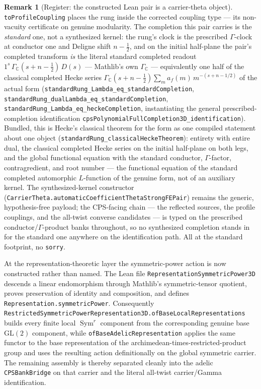 \documentclass[11pt]{article}
\theoremstyle{definition}
\newtheorem{remark}[theorem]{Remark}
\begin{document}
\begin{remark}[Register: the constructed Lean pair is a carrier-theta object]
\texttt{toProfileCoupling} places the rung inside the corrected coupling type --- its
non-vacuity certificate on genuine modularity.  The completion this pair carries is the
\emph{standard} one, not a synthesized kernel: the rung's clock is the prescribed
$\Gamma$-clock at conductor one and Deligne shift $n-\tfrac12$, and on the initial half-plane
the pair's completed transform \emph{is} the literal standard completed readout
$1^{s}\,\Gamma_{\mathbb C}(s+n-\tfrac12)\,D(s)$ --- Mathlib's own $\Gamma_{\mathbb C}$ ---
equivalently one half of the classical completed Hecke series
$\Gamma_{\mathbb C}(s+n-\tfrac12)\sum_m a_f(m)\,m^{-(s+n-1/2)}$ of the actual form
(\texttt{standardRung\_Lambda\_eq\_standardCompletion},
\texttt{standardRung\_dualLambda\_eq\_standardCompletion},
\texttt{standardRung\_Lambda\_eq\_heckeCompletion}, instantiating the general
prescribed-completion identification
\texttt{cpsPolynomialFullCompletion3D\_identification}).  Bundled, this is Hecke's classical
theorem for the form as one compiled statement about one object
(\texttt{standardRung\_classicalHeckeTheorem}): entirety with entire dual, the classical
completed Hecke series on the initial half-plane on both legs, and the global functional
equation with the standard conductor, $\Gamma$-factor, contragredient, and root number ---
the functional equation of the standard completed automorphic $L$-function of the genuine
form, not of an auxiliary kernel.  The synthesized-kernel constructor
(\texttt{CarrierTheta.automaticCoefficientThetaStrongFEPair}) remains the generic,
hypothesis-free payload; the CPS-facing chain --- the reflected sources, the profile couplings,
and the all-twist converse candidates --- is typed on the prescribed
conductor/$\Gamma$-product banks throughout, so no synthesized completion stands in for the
standard one anywhere on the identification path.  All at the standard footprint, no
\texttt{sorry}.

At the representation-theoretic layer the symmetric-power action is now constructed rather than
named.  The Lean file \texttt{RepresentationSymmetricPower3D} descends a linear endomorphism through
Mathlib's symmetric-tensor quotient, proves preservation of identity and composition, and defines
\texttt{Representation.symmetricPower}.  Consequently
\texttt{RestrictedSymmetricPowerRepresentation3D.ofBaseLocalRepresentations} builds every finite
local $\operatorname{Sym}^r$ component from the corresponding genuine base GL$(2)$ component, while
\texttt{ofBaseAdelicRepresentation} applies the same functor to the base representation of the
archimedean-times-restricted-product group and uses the resulting action definitionally on the
global symmetric carrier.  The remaining assembly is thereby separated cleanly into the adelic
\texttt{CPSBankBridge} on that carrier and the literal all-twist carrier/Gamma identification.


\end{remark}
\end{document}
